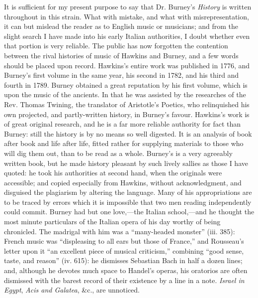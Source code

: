 It is sufficient for my present purpose to say that Dr. Burney’s \textit{History} is
written throughout in this strain. What with mistake, and what with misrepresentation, it can but mislead the reader as to English music or musicians; and
from the slight search I have made into his early Italian authorities, I doubt
whether even that portion is very reliable. The public has now forgotten
the contention between the rival histories of music of Hawkins and Burney, and
a few words should be placed upon record. Hawkins’s entire work was published
in 1776, and Burney’s first volume in the same year, his second in 1782, and his
third and fourth in 1789. Burney obtained a great reputation by his first volume,
which is upon the music of the ancients. In that he was assisted by the researches
of the Rev. Thomas Twining, the translator of Aristotle’s Poetics, who relinquished
his own projected, and partly-written history, in Burney’s favour.
Hawkins’s work is of great original research, and he is a far more reliable
authority for fact than Burney: still the history is by no means so well digested.
It is an analysis of book after book and life after life, fitted rather for supplying
materials to those who will dig them out, than to be read as a whole. Burney’s
is a very agreeably written book, but he made history pleasant by such lively
sallies as those I have quoted: he took his authorities at second hand, when the
originals were accessible; and copied especially from Hawkins, without acknowledgment,
and disguised the plagiarism by altering the language. Many of his appropriations
are to be traced by errors which it is impossible that two men reading
independently could commit. Burney had but one love,—the Italian school,—and
he thought the most minute particulars of the Italian opera of his day worthy
of being chronicled. The madrigal with him was a “many-headed monster”
(iii. 385): 
French music was “displeasing to
\pagebreak
all ears but those of France,” and 
Rousseau’s letter upon it “an excellent piece of musical criticism,” combining 
“good sense, taste, and reason” (iv. 615): he dismisses Sebastian Bach in half
a dozen lines; and, although he devotes much space to Handel’s operas, his
oratorios are often dismissed with the barest record of their existence by a line in
a note. \textit{Israel in Egypt}, \textit{Acis and Galatea}, \&c., are unnoticed.

